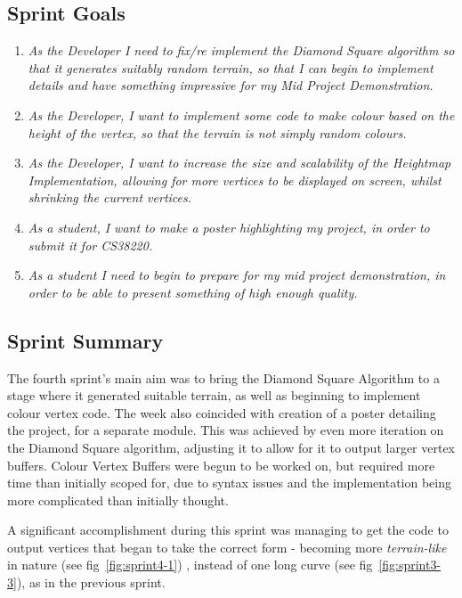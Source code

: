 \documentclass[a4paper,10pt]{report}
\begin{document}
\subsection{Sprint Goals}
\begin{enumerate}
    \item \textit{As the Developer I need to fix/re implement the Diamond Square algorithm so that it generates suitably random terrain, so that I can begin to implement details and have something impressive for my Mid Project Demonstration. }
    \item \textit{As the Developer, I want to implement some code to make colour based on the height of the vertex, so that the terrain is not simply random colours.}
    \item \textit{As the Developer, I want to increase the size and scalability of the Heightmap Implementation, allowing for more vertices to be displayed on screen, whilst shrinking the current vertices. }
    \item \textit{As a student, I want to make a poster highlighting my project, in order to submit it for CS38220.}
    \item \textit{As a student I need to begin to prepare for my mid project demonstration, in order to be able to present something of high enough quality. }
    
\end{enumerate}
\subsection{Sprint Summary}

The fourth sprint's main aim was to bring the Diamond Square Algorithm to a stage where it generated suitable terrain, as well as beginning to implement colour vertex code. The week also coincided with creation of a poster detailing the project, for a separate module. This was achieved by even more iteration on the Diamond Square algorithm, adjusting it to allow for it to output larger vertex buffers. Colour Vertex Buffers were begun to be worked on, but required more time than initially scoped for, due to syntax issues and the implementation being more complicated than initially thought.  \medskip

A significant accomplishment during this sprint was managing to get the code to output vertices that began to take the correct form - becoming more \textit{terrain-like} in nature (see fig~\ref{fig:sprint4-1}) , instead of one long curve (see fig~\ref{fig:sprint3-3}), as in the previous sprint. 
\end{document}
